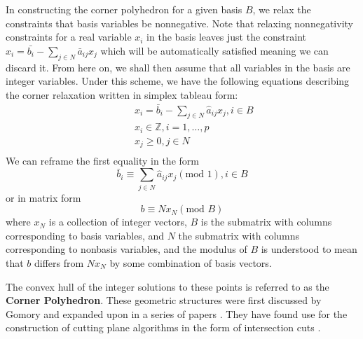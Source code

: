 \documentclass{article}
\begin{document}
	In constructing the corner polyhedron for a given basis $B$, we relax the constraints that basis variables be nonnegative. Note that relaxing nonnegativity constraints for a real variable $x_i$ in the basis leaves just the constraint $x_i = \bar{b_i} - \sum_{j \in N} \bar{a}_{ij}x_j$ which will be automatically satisfied meaning we can discard it. From here on, we shall then assume that all variables in the basis are integer variables.
	Under this scheme, we have the following equations describing the corner relaxation written in simplex tableau form:
	\begin{equation}
	\begin{aligned}
	& & & x_i = \bar{b}_i - \sum_{j\in N} \hat{a}_{ij}x_j, i \in B \\
	& & & x_i \in \mathbb{Z}, i=1,\ldots,p \\
	& & & x_j \ge 0, j \in N \\
	\end{aligned}
	\end{equation}
	We can reframe the first equality in the form
	\begin{equation}
		\bar{b}_i \equiv \sum_{j \in N} \hat{a}_{ij}x_j (\text{mod } 1) ,i \in B 
	\end{equation}
	or in matrix form
	\begin{equation}
		b \equiv Nx_N (\text{mod } B)
		\label{group_relation}
	\end{equation}
	where $x_N$ is a collection of integer vectors, $B$ is the submatrix with columns corresponding to basis variables, and $N$ the submatrix with columns corresponding to nonbasis variables, and the modulus of $B$ is understood to mean that $b$ differs from $Nx_N$ by some combination of basis vectors.

	The convex hull of the integer solutions to these points is referred to as the \textbf{Corner Polyhedron}. These geometric structures were first discussed by Gomory and expanded upon in a series of papers \cite{gomory1969some}. They have found use for the construction of cutting plane algorithms in the form of intersection cuts \cite{conforti2011corner}. 
\end{document}
